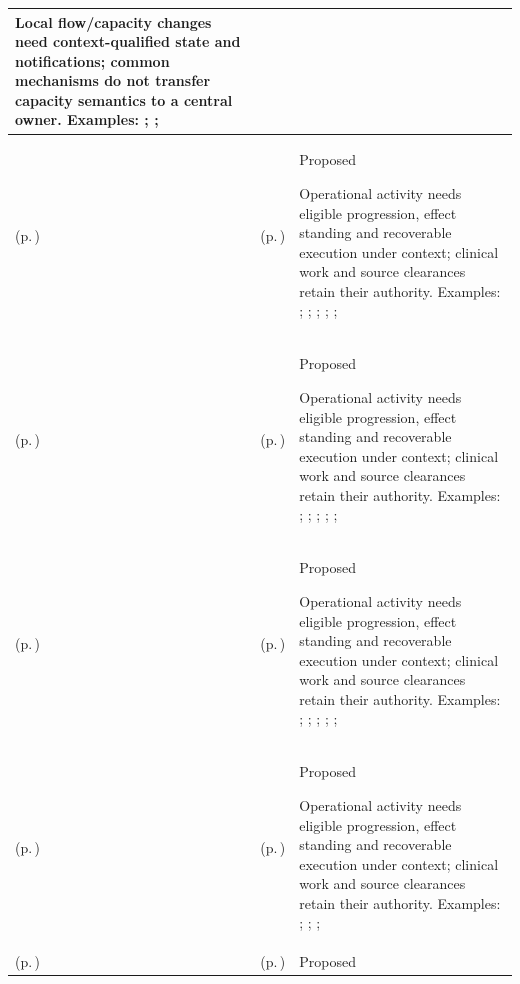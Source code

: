 \begin{longtable}{|>{\raggedright\arraybackslash}p{0.27\TableWidth}|>{\raggedright\arraybackslash}p{0.27\TableWidth}|>{\raggedright\arraybackslash}p{0.46\TableWidth}|}
Local flow/capacity changes need context-qualified state and notifications; common mechanisms do not transfer capacity semantics to a central owner. Examples: \nameref{feature:feat-hso-15}; \nameref{function:aggregate-service-capacity-telemetry}; \nameref{service:regional-health-system-capacity-query}\\\hline
\nameref{cap:bec-work-allocation-dispatch} (p.\,\pageref{cap:bec-work-allocation-dispatch}) & \nameref{cap:ec-02} (p.\,\pageref{cap:ec-02}) & Proposed

Operational activity needs eligible progression, effect standing and recoverable execution under context; clinical work and source clearances retain their authority. Examples: \nameref{feature:feat-hso-19}; \nameref{feature:feat-hso-20}; \nameref{feature:feat-hso-21}; \nameref{feature:feat-hso-22}; \nameref{function:dispatch-operational-work-order}; \nameref{service:work-dispatch-service}\\\hline
\nameref{cap:bec-work-allocation-dispatch} (p.\,\pageref{cap:bec-work-allocation-dispatch}) & \nameref{cap:ec-10} (p.\,\pageref{cap:ec-10}) & Proposed

Operational activity needs eligible progression, effect standing and recoverable execution under context; clinical work and source clearances retain their authority. Examples: \nameref{feature:feat-hso-19}; \nameref{feature:feat-hso-20}; \nameref{feature:feat-hso-21}; \nameref{feature:feat-hso-22}; \nameref{function:dispatch-operational-work-order}; \nameref{service:work-dispatch-service}\\\hline
\nameref{cap:bec-work-allocation-dispatch} (p.\,\pageref{cap:bec-work-allocation-dispatch}) & \nameref{cap:ec-12} (p.\,\pageref{cap:ec-12}) & Proposed

Operational activity needs eligible progression, effect standing and recoverable execution under context; clinical work and source clearances retain their authority. Examples: \nameref{feature:feat-hso-19}; \nameref{feature:feat-hso-20}; \nameref{feature:feat-hso-21}; \nameref{feature:feat-hso-22}; \nameref{function:dispatch-operational-work-order}; \nameref{service:work-dispatch-service}\\\hline
\nameref{cap:bec-patient-transport} (p.\,\pageref{cap:bec-patient-transport}) & \nameref{cap:ec-02} (p.\,\pageref{cap:ec-02}) & Proposed

Operational activity needs eligible progression, effect standing and recoverable execution under context; clinical work and source clearances retain their authority. Examples: \nameref{feature:feat-hso-24}; \nameref{feature:feat-hso-25}; \nameref{function:manage-patient-transport-progression}; \nameref{service:patient-transport-tracking-service}\\\hline
\nameref{cap:bec-patient-transport} (p.\,\pageref{cap:bec-patient-transport}) & \nameref{cap:ec-10} (p.\,\pageref{cap:ec-10}) & Proposed


\end{longtable}
